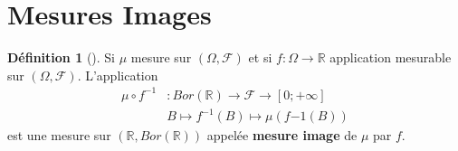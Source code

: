 \documentclass{article}
\theoremstyle{plain}%
\theoremstyle{definition}
\newtheorem{defn}{Définition}[section]
\theoremstyle{remark}
\begin{document}
\section{Mesures Images}
    \begin{defn}[]        
        Si $ \mu  $ mesure sur $ (\Omega, \mathcal{F} ) $ et si $ f: \Omega \to \mathbb{R} $ application mesurable sur $ (\Omega, \mathcal{F}) $. L'application \begin{align*}
            \mu \circ f^{-1} &: Bor(\mathbb{R}) \to \mathcal{F} \to [0;+\infty ] \\
            & B \mapsto f^{-1}(B) \mapsto \mu (f{-1}(B))
        \end{align*}
        est une mesure sur $ (\mathbb{R}, Bor(\mathbb{R})) $ appelée \textbf{mesure image} de $ \mu  $ par $ f $. 
    \end{defn}
\end{document}
